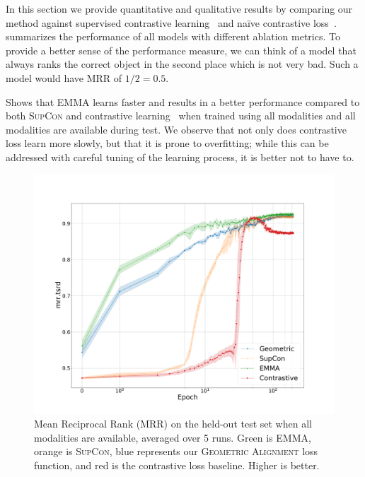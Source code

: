 \documentclass[10pt]{article} %
\newcommand{\ours}{\textsc{EMMA}}
\newcommand{\geom}{\textsc{Geometric Alignment}}
\newcommand{\supcon}{\textsc{SupCon}}
\begin{document}
In this section we provide quantitative and qualitative results by comparing our method against supervised contrastive learning~\cite{NEURIPS2020_supervised_contrastive} and na\"ive contrastive loss~\cite{chen2020simple}.
 summarizes the performance of all models with different ablation metrics.
To provide a better sense of the performance measure, we can think of a model that always ranks the correct object in the second place which is not very bad. Such a model would have MRR of $1/2 = 0.5$.

 Shows that \ours{} learns faster and results in a better performance compared to both \supcon{} and contrastive learning~\cite{chen2020simple} when trained using all modalities and all modalities are available during test. We observe that not only does contrastive loss learn more slowly, but that it is prone to overfitting; while this can be addressed with careful tuning of the learning process, it is better not to have to.

\begin{figure}[tbh]
\centering
\includegraphics[width=.99\columnwidth]{Figures/average-seeds-epochs-mrr_lard}
\caption{Mean Reciprocal Rank (MRR) on the held-out test set when all modalities are available, averaged over 5 runs. Green is \ours{}, orange is \supcon{}, blue represents our \geom{} loss function, and red is the contrastive loss baseline. Higher is better.
}
\label{fig:epochs-mrr.lard}
\end{figure}
\end{document}
